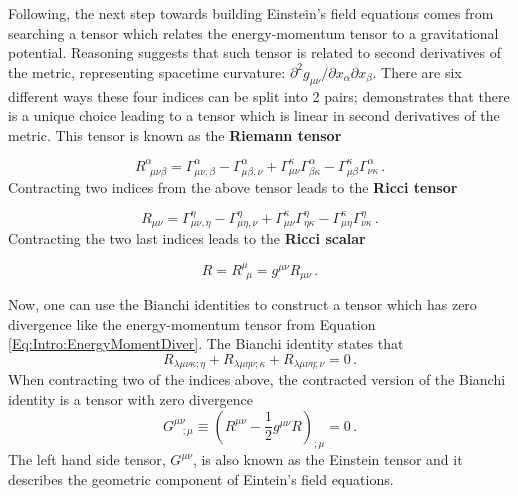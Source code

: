 \qquad Following, the next step towards building Einstein's field equations comes from searching a tensor which relates the energy-momentum tensor to a gravitational potential. Reasoning suggests that such tensor is related to second derivatives of the metric, representing spacetime curvature: $\partial^2 g_{\mu\nu}/\partial x_{\alpha}\partial x_{\beta}$. There are six different ways these four indices can be split into 2 pairs; \cite{Weinberg1972} demonstrates that there is a unique choice leading to a tensor which is linear in second derivatives of the metric. This tensor is known as the \textbf{Riemann tensor} \citep{Peacock}

\begin{equation}
R^{\alpha}_{\ \ \mu\nu\beta} = \Gamma^{\alpha}_{\mu\nu,\beta} - \Gamma^{\alpha}_{\mu\beta, \nu} + \Gamma^{\kappa}_{\mu\nu}\Gamma^{\alpha}_{\beta\kappa} - \Gamma^{\kappa}_{\mu\beta}\Gamma^{\alpha}_{\nu\kappa} \, .
\label{Eq:Intro:Riemman}
\end{equation}
Contracting two indices from the above tensor leads to the \textbf{Ricci tensor}

\begin{equation}
R_{\mu\nu} = \Gamma^{\eta}_{\mu\nu,\eta} - \Gamma^{\eta}_{\mu\eta, \nu} + \Gamma^{\kappa}_{\mu\nu}\Gamma^{\eta}_{\eta\kappa} - \Gamma^{\kappa}_{\mu\eta}\Gamma^{\eta}_{\nu\kappa} \, .
\end{equation}
Contracting the two last indices leads to the \textbf{Ricci scalar}

\begin{equation}
R = R^{\mu}_{\ \ \mu} = g^{\mu\nu}R_{\mu\nu}\, .
\end{equation}

\qquad Now, one can use the Bianchi identities \citep{Weinberg1972,dods} to construct a tensor which has zero divergence like the energy-momentum tensor from Equation \eqref{Eq:Intro:EnergyMomentDiver}. The Bianchi identity states that
\begin{equation}
R_{\lambda\mu\nu\kappa;\eta} + R_{\lambda\mu\eta\nu;\kappa} + R_{\lambda\mu\nu\eta;\nu} = 0 \, .
\end{equation}
When contracting two of the indices above, the contracted version of the Bianchi identity is a tensor with zero divergence
\begin{equation}
G^{\mu\nu}_{\ \ \ \ ; \mu} \equiv \left(R^{\mu\nu} -\frac{1}{2}g^{\mu\nu}R\right)_{;\mu} = 0\, .
\end{equation}
The left hand side tensor, $G^{\mu\nu}$, is also known as the Einstein tensor and it describes the geometric component of Eintein's field equations.

